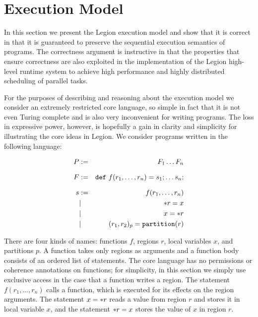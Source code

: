 
\section{Execution Model}
\label{sec:exec}

In this section we present the Legion execution model and show that
it is correct in that it is guaranteed to preserve the sequential
execution semantics of programs.  The correctness argument is
instructive in that the properties that ensure correctness are also
exploited in the implementation of the Legion high-level runtime
system to achieve high performance and highly distributed scheduling
of parallel tasks.

For the purposes of describing and reasoning about the
execution model we consider an extremely restricted core language, so
simple in fact that it is not even Turing complete and is also very
inconvenient for writing programs.  The loss in expressive power, however,
is hopefully a gain in clarity and simplicity for illustrating the core ideas in
Legion.    We consider programs written in the following language:

\begin{eqnarray*}
P & := & F_1 \ldots F_n \\[.1in]
F & := & \mbox{\tt def}\ f(r_1,\ldots,r_n) =   s_1; \ldots s_n; \\[.1in]
s & := & f(r_1,\ldots,r_n) \\
&| & \ast r = x \\
& | & x = \ast r \\
&| & (r_1, r_2)_{p} = \mbox{\tt partition}(r) \\ 
\end{eqnarray*}

There are four kinds of names: functions $f$, regions $r$, local
variables $x$, and partitions $p$.  A function takes only regions as
arguments and a function body consists of an ordered list of
statements.  The core language has no permissions or coherence annotations
on functions; for simplicity, in this section we simply use exclusive access in the case
that a function writes a region.  The statement $f(r_1,\ldots,r_n)$ calls a function, which
is executed for its effects on the region arguments.  The statement $x
= \ast r$ reads a value from region $r$ and stores it in local
variable $x$, and the statement $\ast r = x$ stores the value of $x$
in region $r$.  

